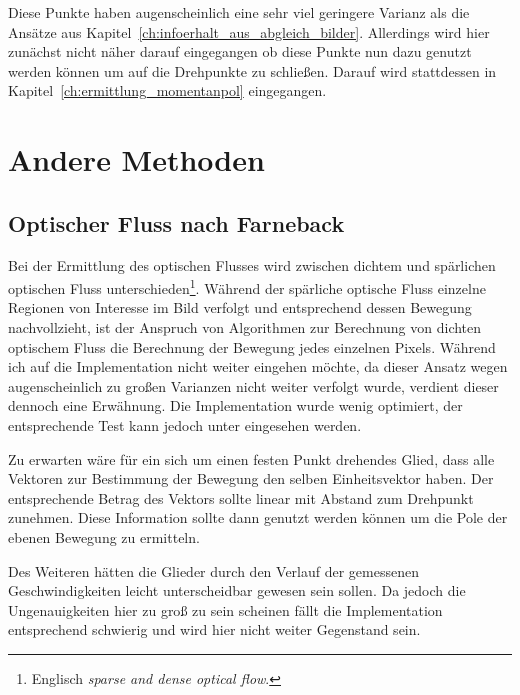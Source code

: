 Diese Punkte haben augenscheinlich eine sehr viel geringere Varianz als die Ansätze aus Kapitel~\ref{ch:infoerhalt_aus_abgleich_bilder}.
Allerdings wird hier zunächst nicht näher darauf eingegangen ob diese Punkte nun dazu genutzt werden können um auf die Drehpunkte zu schlie{\ss}en.
Darauf wird stattdessen in Kapitel~\ref{ch:ermittlung_momentanpol} eingegangen.

\section{Andere Methoden}

\subsection{Optischer Fluss nach Farneback}

Bei der Ermittlung des optischen Flusses wird zwischen dichtem und spärlichen optischen Fluss unterschieden\footnote{Englisch \textit{sparse and dense optical flow}.}.
Während der spärliche optische Fluss einzelne Regionen von Interesse im Bild verfolgt und entsprechend dessen Bewegung nachvollzieht, ist der Anspruch von Algorithmen zur Berechnung von dichten optischem Fluss die Berechnung der Bewegung jedes einzelnen Pixels.
Während ich auf die Implementation nicht weiter eingehen möchte, da dieser Ansatz wegen augenscheinlich zu gro{\ss}en Varianzen nicht weiter verfolgt wurde, verdient dieser dennoch eine Erwähnung.
Die Implementation wurde wenig optimiert, der entsprechende Test kann jedoch unter  eingesehen werden.

Zu erwarten wäre für ein sich um einen festen Punkt drehendes Glied, dass alle Vektoren zur Bestimmung der Bewegung den selben Einheitsvektor haben.
Der entsprechende Betrag des Vektors sollte linear mit Abstand zum Drehpunkt zunehmen.
Diese Information sollte dann genutzt werden können um die Pole der ebenen Bewegung zu ermitteln.

Des Weiteren hätten die Glieder durch den Verlauf der gemessenen Geschwindigkeiten leicht unterscheidbar gewesen sein sollen.
Da jedoch die Ungenauigkeiten hier zu gro{\ss} zu sein scheinen fällt die Implementation entsprechend schwierig und wird hier nicht weiter Gegenstand sein.

